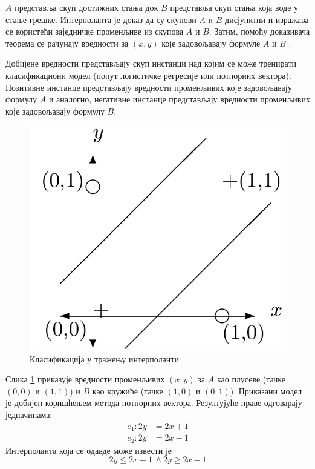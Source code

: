 \documentclass[a4paper]{article}
\begin{document}
{$A$ представља скуп достижних стања док $B$ представља скуп стања која воде у стање грешке. Интерполанта је доказ да су
скупови $A$ и $B$ дисјунктни и изражава се користећи заједничке променљиве из скупова $A$ и $B$. Затим, помоћу доказивача теорема се рачунају вредности за $(x, y)$ које задовољавају формуле $A$ и $B$ \cite{Sharma_interpolantsas}.

Добијене вредности представљају скуп инстанци над којим се може тренирати класификациони модел (попут логистичке регресије или потпорних вектора).
Позитивне инстанце представљају вредности променљивих које задовољавају формулу $A$ и аналогно, негативне инстанце представљају вредности
променљивих које задовољавају формулу $B$.

\begin{figure}[h!]
\begin{center}
\includegraphics[scale=0.2]{./slike/interpolant.png}
\end{center}
\caption{Класификација у тражењу интерполанти}
\label{fig:interpolant_svm}
\end{figure}

Слика \ref{fig:interpolant_svm} приказује вредности променљивих $(x, y)$ за $A$ као плусеве (тачке $(0, 0)$ и $(1, 1)$)
и $B$ као кружиће (тачке $(1, 0)$ и $(0, 1)$). Приказани модел је добијен коришћењем метода потпорних вектора. Резултујуће праве одговарају једначинама:
\begin{equation*}
\begin{split}
    e_1: 2y &= 2x + 1 \\
    e_2: 2y &= 2x - 1
\end{split}
\end{equation*}
Интерполанта која се одавде може извести је
\begin{equation*}
2y \leq 2x + 1 \, \land 2y \geq 2x - 1
\end{equation*}

}
\end{document}
